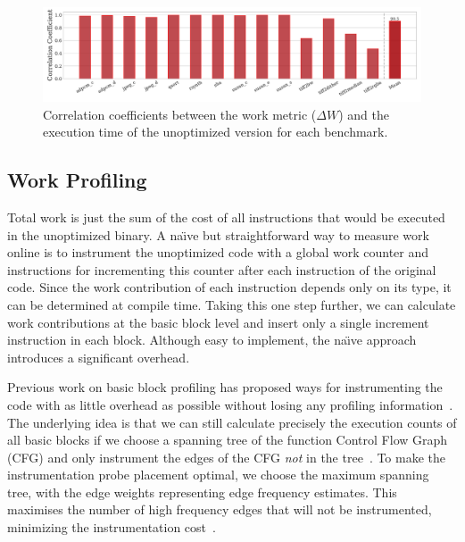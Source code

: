 \begin{figure}[t]
    \centering
    \includegraphics[width=\textwidth]{figs/corr_coeff.pdf}
    \caption{Correlation coefficients between the work metric ($\Delta W$) and the execution time of the unoptimized version for each benchmark.}
    \label{fig:motivation-speedups}
\end{figure}


    \subsection{Work Profiling}\label{subsec:prof}

    Total work is just the sum of the cost of all instructions that would be executed in the unoptimized binary. A na\"{\i}ve but
    straightforward way to measure work online is to instrument the unoptimized code with a global work counter and instructions for
    incrementing this counter after each instruction of the original code. Since the work contribution of each instruction depends only on
    its type, it can be determined at compile time. Taking this one step further, we can calculate work contributions at the basic block
    level and insert only a single increment instruction in each block. Although easy to implement, the na\"{\i}ve approach introduces a
    significant overhead.

    Previous work on basic block profiling has proposed ways for instrumenting the code with as little overhead as possible without losing
    any profiling information~\cite{knuth73,ball94}. The underlying idea is that we can still calculate precisely the execution counts of
    all basic blocks if we choose a spanning tree of the function Control Flow Graph (CFG) and only instrument the edges of the CFG
    \textit{not} in the tree~\cite{nahapetian73,forman81}. To make the instrumentation probe placement optimal, we choose the maximum
    spanning tree, with the edge weights representing edge frequency estimates. This maximises the number of high frequency edges that will
    not be instrumented, minimizing the instrumentation cost~\cite{forman81,ball94}. 
    
